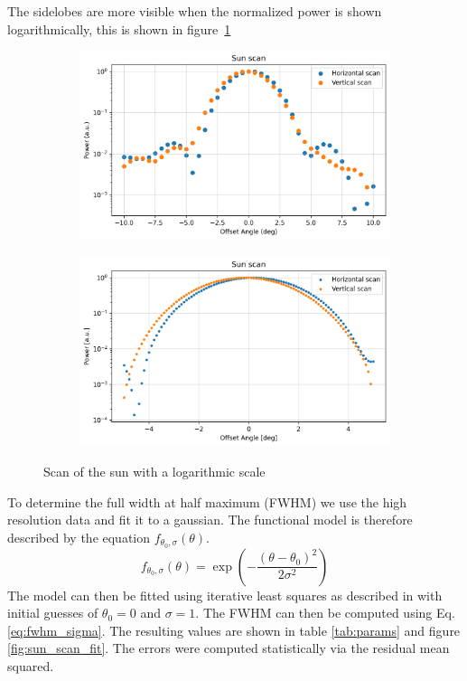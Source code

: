The sidelobes are more visible when the normalized power is shown logarithmically, this is shown in figure~\ref{fig:sun_scan_log}
\begin{figure}[H]
    \centering
    \begin{subfigure}[t]{0.45\linewidth}
        \includegraphics[width=\linewidth]{assets/sun_scan_low_res_log.png}
    \end{subfigure}
    \begin{subfigure}[t]{0.45\linewidth}
        \includegraphics[width=\linewidth]{assets/sun_scan_high_res_log.png}
    \end{subfigure}
    \caption{Scan of the sun with a logarithmic scale}
    \label{fig:sun_scan_log}
\end{figure}

To determine the full width at half maximum (FWHM) we use the high resolution data and fit it to a gaussian.
The functional model is therefore described by the equation $f_{\theta_0, \sigma}(\theta)$.
\begin{equation}
    f_{\theta_0, \sigma}(\theta) = \exp{\left(-\frac{(\theta-\theta_0)^2}{2\sigma^2}\right)}
\end{equation}
The model can then be fitted using iterative least squares as described in \cite{ghilani_adjustment_2006} with initial guesses of $\theta_0 = 0$ and $\sigma = 1$. The FWHM can then be computed using Eq. \eqref{eq:fwhm_sigma}.
The resulting values are shown in table \ref{tab:params} and figure \ref{fig:sun_scan_fit}. The errors were computed statistically via the residual mean squared.


